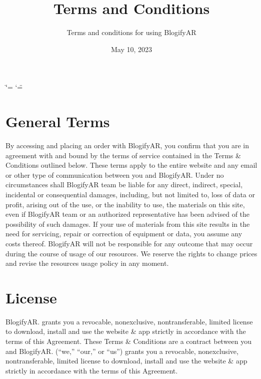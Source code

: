 \documentclass[letterpaper,11pt,openany,oneside,english,openany]{sphinxmanual}
\title{Terms and Conditions}
\date{May 10, 2023}
\author{Terms and conditions for using BlogifyAR}
\begin{document}
\ifdefined\shorthandoff
  \ifnum\catcode`\=\string=\active\shorthandoff{=}\fi
  \ifnum\catcode`\"=\active{}\fi
\fi

\pagestyle{empty}
\sphinxmaketitle
\pagestyle{plain}
\sphinxtableofcontents
\pagestyle{normal}
\label{\detokenize{terms_and_conditions::doc}}





\chapter{\sphinxhyphen{}General Terms}
\label{\detokenize{terms_and_conditions:general-terms}}
\sphinxAtStartPar
By accessing and placing an order with BlogifyAR, you confirm that you are in agreement with and bound by the terms of
service contained in the Terms \& Conditions outlined below. These terms apply to the entire website and any email or other
type of communication between you and BlogifyAR.
Under no circumstances shall BlogifyAR team be liable for any direct, indirect, special, incidental or consequential damages,
including, but not limited to, loss of data or profit, arising out of the use, or the inability to use, the materials on this site, even
if BlogifyAR team or an authorized representative has been advised of the possibility of such damages. If your use of
materials from this site results in the need for servicing, repair or correction of equipment or data, you assume any costs
thereof.
BlogifyAR will not be responsible for any outcome that may occur during the course of usage of our resources. We reserve
the rights to change prices and revise the resources usage policy in any moment.


\chapter{\sphinxhyphen{}License}
\label{\detokenize{terms_and_conditions:license}}
\sphinxAtStartPar
BlogifyAR. grants you a revocable, non\sphinxhyphen{}exclusive, non\sphinxhyphen{}transferable, limited license to download, install and use the website
\& app strictly in accordance with the terms of this Agreement. These Terms \& Conditions are a contract between you and
BlogifyAR. (“we,” “our,” or “us”) grants you a revocable, non\sphinxhyphen{}exclusive, non\sphinxhyphen{}transferable, limited license to download, install
and use the website \& app strictly in accordance with the terms of this Agreement.
\end{document}
